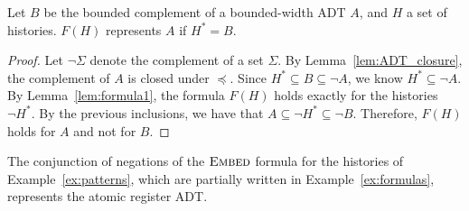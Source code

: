 \begin{lemma}
  \label{lem:formula2}

  Let $B$ be the bounded complement of a bounded-width ADT $A$, and $H$
  a set of histories. $F(H)$ represents $A$ if $H^* = B$.

\end{lemma}

\begin{proof}

  Let $\neg \Sigma$ denote the complement of a set $\Sigma$. By
  Lemma~\ref{lem:ADT_closure}, the complement of $A$ is closed under $\preceq$.
  Since $H^* \subseteq B\subseteq \neg A$, we know
  $H^* \subseteq \neg A$. By Lemma~\ref{lem:formula1}, the formula $F(H)$ holds
  exactly for the histories $\neg H^*$. By the previous inclusions, we
  have that $A\subseteq \neg H^* \subseteq \neg B$. Therefore, $F(H)$ holds for
  $A$ and not for $B$.
\end{proof}

\begin{example}

  The conjunction of negations of the $\textsc{Embed}$ formula for the
  histories of Example~\ref{ex:patterns}, which are partially written in
  Example~\ref{ex:formulas}, represents the atomic register ADT.

\end{example}
